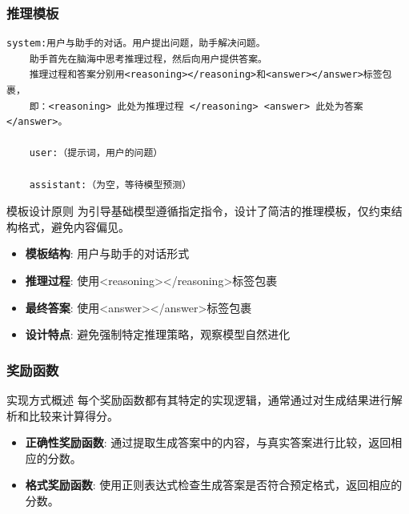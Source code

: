 \documentclass[10pt,aspectratio=169]{beamer}
\begin{document}
\begin{frame}[fragile]
    \frametitle{推理模板}
    \begin{lstlisting}[basicstyle=\small]
    system:用户与助手的对话。用户提出问题，助手解决问题。
    助手首先在脑海中思考推理过程，然后向用户提供答案。
    推理过程和答案分别用<reasoning></reasoning>和<answer></answer>标签包裹，
    即：<reasoning> 此处为推理过程 </reasoning> <answer> 此处为答案 </answer>。

    user:（提示词，用户的问题）

    assistant:（为空，等待模型预测）

    \end{lstlisting}
    
    \begin{block}{模板设计原则}
        为引导基础模型遵循指定指令，设计了简洁的推理模板，仅约束结构格式，避免内容偏见。
    \end{block}
    \begin{itemize}
        \item \textbf{模板结构}: 用户与助手的对话形式
        \item \textbf{推理过程}: 使用<reasoning></reasoning>标签包裹
        \item \textbf{最终答案}: 使用<answer></answer>标签包裹
        \item \textbf{设计特点}: 避免强制特定推理策略，观察模型自然进化
    \end{itemize}
\end{frame}

\begin{frame}
    \frametitle{奖励函数}
    \begin{block}{实现方式概述}
        每个奖励函数都有其特定的实现逻辑，通常通过对生成结果进行解析和比较来计算得分。
    \end{block}
    \begin{itemize}
        \item \textbf{正确性奖励函数}: 通过提取生成答案中的内容，与真实答案进行比较，返回相应的分数。
        \item \textbf{格式奖励函数}: 使用正则表达式检查生成答案是否符合预定格式，返回相应的分数。
    \end{itemize}
\end{frame}
\end{document}
